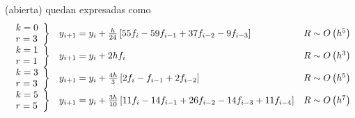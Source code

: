 \documentclass[spanish,titlepage,11pt]{article}
\begin{document}
(abierta) quedan expresadas como
\[%
\begin{array}
[c]{lll}%
\left.
\begin{array}
[c]{l}%
k=0\\
r=3
\end{array}
\right\}  & y_{i+1}=y_{i}+\frac{h}{24}\left[  55f_{i}-59f_{i-1}+37f_{i-2}%
-9f_{i-3}\right]  & R\sim O\left(  h^{5}\right) \\
\left.
\begin{array}
[c]{l}%
k=1\\
r=1
\end{array}
\right\}  & y_{i+1}=y_{i}+2hf_{i} & R\sim O\left(  h^{3}\right) \\
\left.
\begin{array}
[c]{l}%
k=3\\
r=3
\end{array}
\right\}  & y_{i+1}=y_{i}+\frac{4h}{3}\left[  2f_{i}-f_{i-1}+2f_{i-2}\right]
& R\sim O\left(  h^{5}\right) \\
\left.
\begin{array}
[c]{l}%
k=5\\
r=5
\end{array}
\right\}  & y_{i+1}=y_{i}+\frac{3h}{10}\left[  11f_{i}-14f_{i-1}%
+26f_{i-2}-14f_{i-3}+11f_{i-4}\right]  & R\sim O\left(  h^{7}\right)
\end{array}
\]
\end{document}
